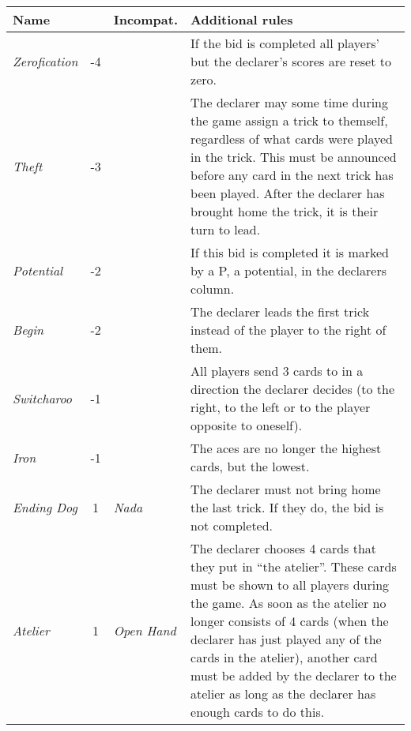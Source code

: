 \begin{table}
	\begin{center}
		\footnotesize {
			\begin{tabularx}{\textwidth}{ lcX | p{6cm} }
					\textbf{Name} & \rotccw{\textbf{Worth}} & \textbf{Incompat.} & \textbf{Additional rules}
					\\ \hline
					
					\textit{Zerofication} & -4 &
					&
					If the bid is completed all players' but the declarer's scores are reset to zero.
					\\ \hline
					
					\textit{Theft} & -3 &
					&
					The declarer may some time during the game assign a trick to themself, regardless of what cards were played in the trick. This must be announced before any card in the next trick has been played. After the declarer has brought home the trick, it is their turn to lead.
					\\ \hline
					
					\textit{Potential} & -2 &
					&
					If this bid is completed it is marked by a P, a potential, in the declarers column.
					\\ \hline
					
					\textit{Begin} & -2 &
					&
					The declarer leads the first trick instead of the player to the right of them.
					\\ \hline
					
					\textit{Switcharoo} & -1 &
					&
					All players send 3 cards to in a direction the declarer decides (to the right, to the left or to the player opposite to oneself).
					\\ \hline
					
					\textit{Iron} & -1 &
					&
					The aces are no longer the highest cards, but the lowest.
					\\ \hline
					
					\textit{Ending Dog} & 1 &
					\textit{Nada} &
					The declarer must not bring home the last trick. If they do, the bid is not completed.
					\\ \hline
					
					\textit{Atelier} & 1 &
					\textit{Open Hand} &
					The declarer chooses 4 cards that they put in ``the atelier''. These cards must be shown to all players during the game. As soon as the atelier no longer consists of 4 cards (when the declarer has just played any of the cards in the atelier), another card must be added by the declarer to the atelier as long as the declarer has enough cards to do this.
					\\ \hline
					

\end{tabularx}}
\end{center}
\end{table}
